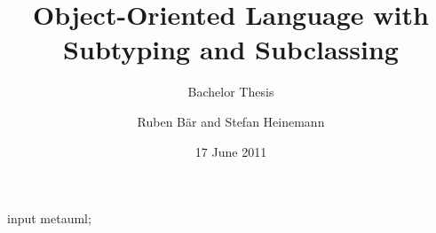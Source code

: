 \begin{empfile}
\begin{empcmds}
input metauml;
\end{empcmds}


\title{Object-Oriented Language with Subtyping and Subclassing}
\subtitle{Bachelor Thesis}

\author{Ruben Bär and Stefan Heinemann}

\date{17 June 2011}



\maketitle

\listoftodos





\thispagestyle{empty}

\setcounter{tocdepth}{1}
\tableofcontents

\newpage
{}

\renewcommand*{\partpagestyle}{empty}

















\end{empfile}

